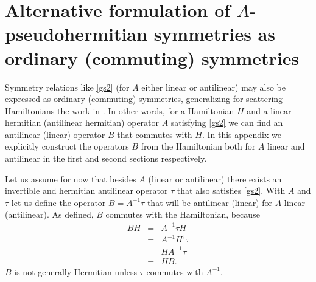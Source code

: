 
\chapter{Alternative formulation of $A$-pseudohermitian symmetries as ordinary (commuting) symmetries}
\label{Appendix:AlternativeFormulationOfPseudoHermiticity}

%

Symmetry relations like \eqref{gs2} (for $A$ either linear or antilinear) may also be expressed as ordinary (commuting) symmetries, generalizing for scattering Hamiltonians the work in \cite{Mostafazadeh2002,Mostafazadeh2002a,Mostafazadeh2002b}. In other words, for a Hamiltonian $H$ and a linear hermitian (antilinear hermitian) operator $A$ satisfying \eqref{gs2} we can find an antilinear (linear) operator $B$ that commutes with $H$. In this appendix we explicitly construct the operators $B$ from the Hamiltonian both for $A$ linear and antilinear in the first and second sections respectively.

Let us assume for now that besides $A$ (linear or antilinear) there exists an invertible and hermitian antilinear operator $\tau$ that also satisfies \eqref{gs2}. With $A$ and $\tau$ let us define the operator $B = A^{-1} \tau$ that will be antilinear (linear) for $A$ linear (antilinear). As defined, $B$ commutes with the Hamiltonian, because
%
\begin{eqnarray}
    B H &=& A^{-1}\tau H \nonumber \\
           &=& A^{-1} H^\dagger \tau \nonumber \\
           &=& H A^{-1} \tau\nonumber \\
           &=& H B.
    \label{eq:HiddenSymmetry}
\end{eqnarray}
%
$B$ is not generally Hermitian unless $\tau$ commutes with $A^{-1}$.

